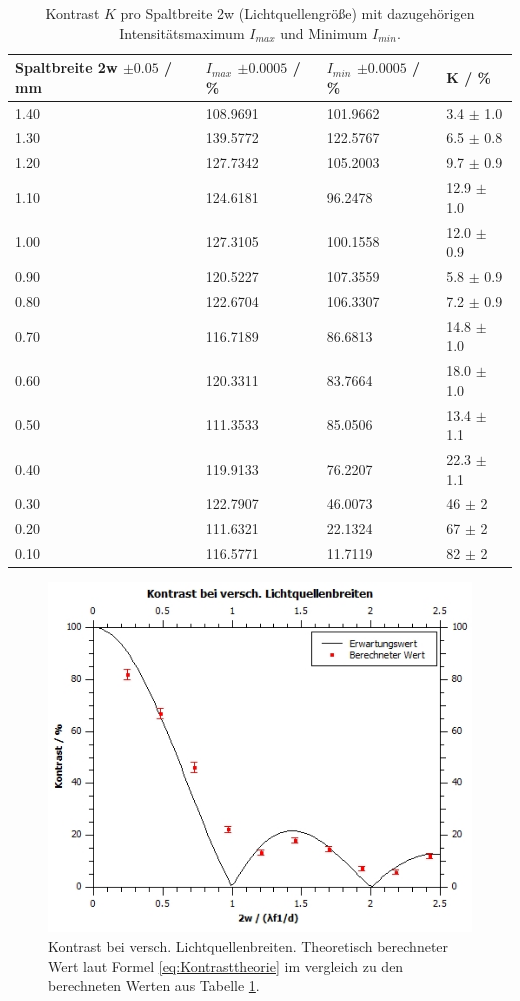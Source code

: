 \documentclass[12pt,a4paper,twoside]{article}
\begin{document}
\begin{table}[H]
    \centering
    \caption{Kontrast $K$ pro Spaltbreite 2w (Lichtquellengröße) mit dazugehörigen Intensitätsmaximum $I_{max}$ und Minimum $I_{min}$.  }
    \label{tab:kontrast}
    \begin{tabular}{| l | l | l | l |}
        \hline
        Spaltbreite 2w $\pm 0.05$ / mm & $I_{max}$ $\pm 0.0005 $ / \% & $I_{min}$ $\pm 0.0005$ / \% & K / \% \\
        \hline
        1.40 & 108.9691 & 101.9662  & 3.4   $\pm$ 1.0   \\
        1.30 & 139.5772 & 122.5767  & 6.5   $\pm$ 0.8   \\
        1.20 & 127.7342 & 105.2003  & 9.7   $\pm$ 0.9   \\
        1.10 & 124.6181 & 96.2478   & 12.9  $\pm$ 1.0   \\
        1.00 & 127.3105 & 100.1558  & 12.0  $\pm$ 0.9   \\
        0.90 & 120.5227 & 107.3559  & 5.8   $\pm$ 0.9   \\
        0.80 & 122.6704 & 106.3307  & 7.2   $\pm$ 0.9   \\
        0.70 & 116.7189 & 86.6813   & 14.8  $\pm$ 1.0   \\
        0.60 & 120.3311 & 83.7664   & 18.0  $\pm$ 1.0   \\
        0.50 & 111.3533 & 85.0506   & 13.4  $\pm$ 1.1   \\
        0.40 & 119.9133 & 76.2207   & 22.3  $\pm$ 1.1   \\
        0.30 & 122.7907 & 46.0073   & 46    $\pm$ 2     \\
        0.20 & 111.6321 & 22.1324   & 67    $\pm$ 2     \\
        0.10 & 116.5771 & 11.7119   & 82    $\pm$ 2     \\
        \hline
    \end{tabular}
\end{table}

\begin{figure}[H]
    \centering
    \includegraphics[width=0.6\linewidth]{nudes/kontrast.jpg}
    \caption{Kontrast bei versch. Lichtquellenbreiten. Theoretisch berechneter Wert laut Formel \ref{eq:Kontrasttheorie} im vergleich zu den berechneten Werten aus Tabelle \ref{tab:kontrast}. }
    \label{fig:aufgabe 1 kontrast}
\end{figure}
\end{document}
